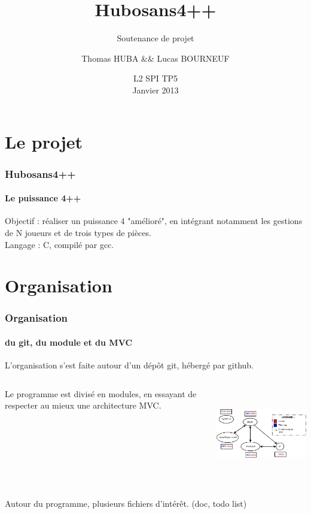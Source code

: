 \documentclass{beamer}
\title{Hubosans4++}
\subtitle{Soutenance de projet}
\author{Thomas HUBA \&\& Lucas BOURNEUF}
\date{L2 SPI TP5\\ Janvier 2013}
\begin{document}
    \frame{\titlepage}


    \section{Le projet}
    \begin{frame}
    \frametitle{Hubosans4++}
    \framesubtitle{Le puissance 4++}
        Objectif : réaliser un puissance 4 "amélioré", 
            en intégrant notamment les gestions de N joueurs 
            et de trois types de pièces. \\     
        \vspace{2cm} %
        Langage : C, compilé par gcc. \\
    \end{frame}



    \section{Organisation}
    \begin{frame}
    \frametitle{Organisation}
    \framesubtitle{du git, du module et du MVC}
        L'organisation s'est faite autour d'un dépôt git, 
            hébergé par github.  
        \vspace{1cm} %
        \begin{columns}[c] %
            \begin{column}{5cm} %
                Le programme est divisé en modules, en essayant 
                    de respecter au mieux une architecture MVC. 
            \end{column}
            \begin{column}{7cm} %
                \includegraphics[width=7cm, height=4cm]{ressources/presentation/archi_projet.jpeg}
            \end{column}
        \end{columns}
        \vspace{1cm} %
        Autour du programme, plusieurs fichiers d'intérêt.
            (doc, todo list)
    \end{frame}
\end{document}
